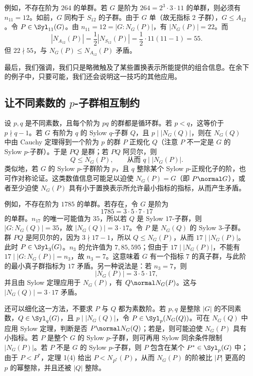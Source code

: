 例如，不存在阶为 $264$ 的单群。若 $G$ 是阶为 $264=2^3\cdot3\cdot11$ 的单群，则必须有 $n_{11}=12$。如前，$G$ 同构于 $S_{12}$ 的子群。由于 $G$ 单（故无指标 $2$ 子群），$G\leq A_{12}$。令 $P\in\Syl_{11}(G)$。由 $n_{11}=12=|G:N_G(P)|$，有 $|N_G(P)|=22$。而
\[
  |N_{A_{12}}(P)|=\frac12|N_{S_{12}}(P)|=\frac12\cdot11(11-1)=55.
\]
但 $22\nmid55$，与 $N_G(P)\leq N_{A_{12}}(P)$ 矛盾。

最后，我们强调，我们只是略微触及了某些置换表示所能提供的组合信息。在余下的例子中，只要可能，我们还会说明这一技巧的其他应用。

\subsection*{让不同素数的 $p$-子群相互制约}

设 $p,q$ 是不同素数，且每个阶为 $pq$ 的群都是循环群。若 $p<q$，这等价于 $p\nmid q-1$。若 $G$ 有阶为 $q$ 的 Sylow $q$-子群 $Q$，且 $p\mid |N_G(Q)|$，则在 $N_G(Q)$ 中由 Cauchy 定理得到一个阶为 $p$ 的群 $P$ 正规化 $Q$（注意 $P$ 不一定是 $G$ 的 Sylow $p$-子群）。于是 $PQ$ 是群；若 $PQ$ 阿贝尔，则
\[
  Q\leq N_G(P),
  \qquad \text{从而 } q\mid |N_G(P)|.
\]
类似地，若 $G$ 的 Sylow $p$-子群阶为 $p$，且 $q$ 整除某个 Sylow $p$-正规化子的阶，也可作对称论证。这类数值信息可能足以迫使 $N_G(P)=G$（即 $P\normal G$），或者至少迫使 $N_G(P)$ 具有小于置换表示所允许最小指标的指标，从而产生矛盾。

例如，不存在阶为 $1785$ 的单群。若存在，令 $G$ 是阶为
\[
  1785=3\cdot5\cdot7\cdot17
\]
的单群。$n_{17}$ 的唯一可能值为 $35$，所以若 $Q$ 是 Sylow $17$-子群，则 $|G:N_G(Q)|=35$，故 $|N_G(Q)|=3\cdot17$。令 $P$ 是 $N_G(Q)$ 的 Sylow $3$-子群。群 $PQ$ 是阿贝尔的，因为 $3\nmid 17-1$，所以 $Q\leq N_G(P)$，从而 $17\mid |N_G(P)|$。此时 $P\in\Syl_3(G)$。$n_3$ 的允许值为 $7,85,595$；但由于 $17\mid |N_G(P)|$，不能有 $17\mid |G:N_G(P)|=n_3$，故 $n_3=7$。这意味着 $G$ 有一个指标 $7$ 的真子群，与此阶的最小真子群指标为 $17$ 矛盾。另一种说法是：若 $n_3=7$，则
\[
  |N_G(P)|=3\cdot5\cdot17,
\]
并且由 Sylow 定理应用于 $N_G(P)$，有 $Q\normal N_G(P)$。这与 $|N_G(Q)|=3\cdot17$ 矛盾。

还可以细化这一方法，不要求 $P$ 与 $Q$ 都为素数阶。若 $p,q$ 是整除 $|G|$ 的不同素数，$Q\in\Syl_q(G)$，且 $p\mid |N_G(Q)|$，令 $P\in\Syl_p(N_G(Q))$。可在 $N_G(Q)$ 中应用 Sylow 定理，判断是否 $P\normal N_G(Q)$；若是，则可能迫使 $N_G(P)$ 具有小指标。若 $P$ 是整个 $G$ 的 Sylow $p$-子群，则可再用 Sylow 同余条件限制 $|N_G(P)|$。若 $P$ 不是 $G$ 的 Sylow $p$-子群，则 $P$ 包含在某个 $P^*\in\Syl_p(G)$ 中；由于 $P<P^*$，定理 1(4) 给出 $P<N_{P^*}(P)$，从而 $N_G(P)$ 的阶被比 $|P|$ 更高的 $p$ 的幂整除，并且还被 $|Q|$ 整除。

